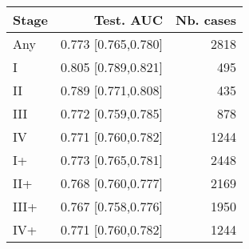 \begin{table}[ht]
\centering
\begin{tabular}{lrr}
  \toprule
Stage & Test. AUC & Nb. cases \\ 
  \midrule
Any & 0.773 [0.765,0.780] & 2818 \\ 
   \addlinespace
I & 0.805 [0.789,0.821] & 495 \\ 
  II & 0.789 [0.771,0.808] & 435 \\ 
  III & 0.772 [0.759,0.785] & 878 \\ 
  IV & 0.771 [0.760,0.782] & 1244 \\ 
   \addlinespace
I+ & 0.773 [0.765,0.781] & 2448 \\ 
  II+ & 0.768 [0.760,0.777] & 2169 \\ 
  III+ & 0.767 [0.758,0.776] & 1950 \\ 
  IV+ & 0.771 [0.760,0.782] & 1244 \\ 
   \bottomrule
\end{tabular}
\end{table}
